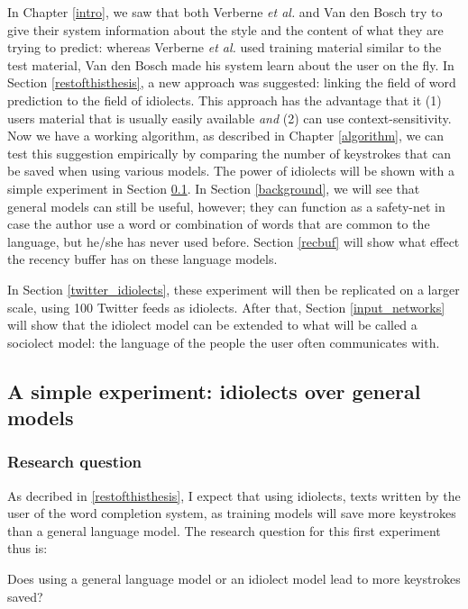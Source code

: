 \documentclass[11pt]{article}
\begin{document}
In Chapter \ref{intro}, we saw that both Verberne {\em et al.}  and Van den Bosch  try to give their system information about the style and the content of what they are trying to predict: whereas Verberne {\em et al.}  used training material similar to the test material, Van den Bosch  made his system learn about the user on the fly. In Section \ref{restofthisthesis}, a new approach was suggested: linking the field of word prediction to the field of idiolects. This approach has the advantage that it (1) users material that is usually easily available \emph{and} (2) can use context-sensitivity. Now we have a working algorithm, as described in Chapter \ref{algorithm}, we can test this suggestion empirically by comparing the number of keystrokes that can be saved when using various models. The power of idiolects will be shown with a simple experiment in Section \ref{simple_exp}. In Section \ref{background}, we will see that general models can still be useful, however; they can function as a safety-net in case the author use a word or combination of words that are common to the language, but he/she has never used before. Section \ref{recbuf} will show what effect the recency buffer has on these language models.

In Section \ref{twitter_idiolects}, these experiment will then be replicated on a larger scale, using 100 Twitter feeds as idiolects. After that, Section \ref{input_networks} will show that the idiolect model can be extended to what will be called a sociolect model: the language of the people the user often communicates with.

\subsection{A simple experiment: idiolects over general models} \label{simple_exp}

\subsubsection{Research question}
As decribed in \ref{restofthisthesis}, I expect that using idiolects, texts written by the user of the word completion system, as training models will save more keystrokes than a general language model. The research question for this first experiment thus is:

\begin{examples}

\item Does using a general language model or an idiolect model lead to more keystrokes saved?

\end{examples}
\end{document}
